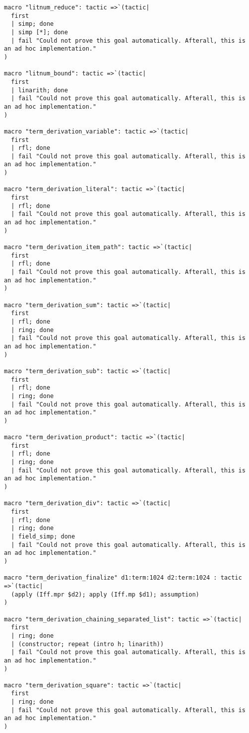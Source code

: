 \documentclass{article}
\begin{document}
\begin{tcolorbox}[colback=white!10, width=\linewidth]
\begin{lstlisting}[language=Lean4]
macro "litnum_reduce": tactic =>`(tactic|
  first
  | simp; done
  | simp [*]; done
  | fail "Could not prove this goal automatically. Afterall, this is an ad hoc implementation."
)

macro "litnum_bound": tactic =>`(tactic|
  first
  | linarith; done
  | fail "Could not prove this goal automatically. Afterall, this is an ad hoc implementation."
)

macro "term_derivation_variable": tactic =>`(tactic|
  first
  | rfl; done
  | fail "Could not prove this goal automatically. Afterall, this is an ad hoc implementation."
)

macro "term_derivation_literal": tactic =>`(tactic|
  first
  | rfl; done
  | fail "Could not prove this goal automatically. Afterall, this is an ad hoc implementation."
)

macro "term_derivation_item_path": tactic =>`(tactic|
  first
  | rfl; done
  | fail "Could not prove this goal automatically. Afterall, this is an ad hoc implementation."
)

macro "term_derivation_sum": tactic =>`(tactic|
  first
  | rfl; done
  | ring; done
  | fail "Could not prove this goal automatically. Afterall, this is an ad hoc implementation."
)

macro "term_derivation_sub": tactic =>`(tactic|
  first
  | rfl; done
  | ring; done
  | fail "Could not prove this goal automatically. Afterall, this is an ad hoc implementation."
)

macro "term_derivation_product": tactic =>`(tactic|
  first
  | rfl; done
  | ring; done
  | fail "Could not prove this goal automatically. Afterall, this is an ad hoc implementation."
)

macro "term_derivation_div": tactic =>`(tactic|
  first
  | rfl; done
  | ring; done
  | field_simp; done
  | fail "Could not prove this goal automatically. Afterall, this is an ad hoc implementation."
)

macro "term_derivation_finalize" d1:term:1024 d2:term:1024 : tactic =>`(tactic|
  (apply (Iff.mpr $d2); apply (Iff.mp $d1); assumption)
)

macro "term_derivation_chaining_separated_list": tactic =>`(tactic|
  first
  | ring; done
  | (constructor; repeat (intro h; linarith))
  | fail "Could not prove this goal automatically. Afterall, this is an ad hoc implementation."
)

macro "term_derivation_square": tactic =>`(tactic|
  first
  | ring; done
  | fail "Could not prove this goal automatically. Afterall, this is an ad hoc implementation."
)


\end{lstlisting}
\end{tcolorbox}
\end{document}
